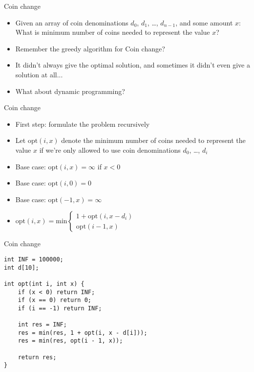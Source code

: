    \begin{frame}[fragile]{Coin change}
    \begin{itemize}
\item Given an array of coin denominations $d_0$, $d_1$, \ldots, $d_{n-1}$,
            and some amount $x$: What is minimum number of coins needed to
            represent the value $x$?

        \item Remember the greedy algorithm for Coin change?
        \item It didn't always give the optimal solution, and sometimes it didn't even give a solution at all...

        \item What about dynamic programming?
    \end{itemize}
\end{frame}

   \begin{frame}[fragile]{Coin change}
    \begin{itemize}
        \item First step: formulate the problem recursively
\item Let $\mathrm{opt}(i,x)$ denote the minimum number of coins needed to represent the value $x$ if we're only allowed to use coin denominations $d_0$, \ldots, $d_i$
        \item Base case: $\mathrm{opt}(i,x) = \infty$ if $x < 0$
        \item Base case: $\mathrm{opt}(i,0) = 0$
        \item Base case: $\mathrm{opt}(-1,x) = \infty$
\item $\mathrm{opt}(i,x) = \mathrm{min} \left\{
	\begin{array}{l}
        1 + \mathrm{opt}(i, x - d_i) \\
        \mathrm{opt}(i-1, x)
	\end{array}
\right.$
    \end{itemize}
\end{frame}

   \begin{frame}[fragile]{Coin change}
    \begin{lstlisting}
int INF = 100000;
int d[10];

int opt(int i, int x) {
    if (x < 0) return INF;
    if (x == 0) return 0;
    if (i == -1) return INF;

    int res = INF;
    res = min(res, 1 + opt(i, x - d[i]));
    res = min(res, opt(i - 1, x));

    return res;
}
    \end{lstlisting}
\end{frame}

